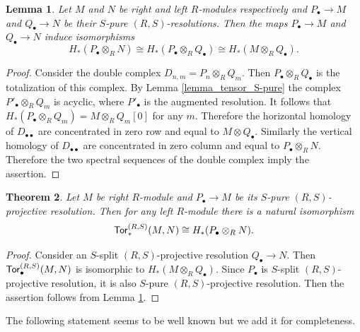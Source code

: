 \documentclass{amsart}
\numberwithin{equation}{section}
\newtheorem{theorem}{Theorem}[section]
\newtheorem{lemma}[theorem]{Lemma}
\theoremstyle{definition}
\begin{document}
\begin{lemma}\label{lemma_balance} Let $M$ and $N$ be right and left $R$-modules respectively and $P_\bullet\to M$ and $Q_\bullet \to N$ be their $S$-pure $(R,S)$-resolutions. Then the maps $P_\bullet\to M$ and $Q_\bullet\to N$ induce isomorphisms
$$H_*(P_\bullet\otimes_R N ) \cong H_*(P_\bullet \otimes_R Q_\bullet ) \cong H_*(M \otimes_R Q_\bullet).$$ 
\end{lemma}
\begin{proof}
Consider the double complex $D_{n,m}=P_n\otimes_RQ_m.$ Then $P_\bullet \otimes_R  Q_\bullet$ is the totalization of this complex. By Lemma \ref{lemma_tensor_S-pure} the complex $P'_\bullet \otimes_R Q_m$ is acyclic, where $P'_\bullet$ is the augmented resolution. It follows that $H_*(P_\bullet \otimes_R Q_m)=M\otimes_R Q_m [0]$ for any $m.$  Therefore the horizontal homology of $D_{\bullet\bullet}$ are concentrated in zero row and equal to $M\otimes Q_\bullet.$ Similarly the vertical homology of $D_{\bullet \bullet}$ are concentrated in zero column and equal to $P_\bullet \otimes_R N.$ Therefore the two spectral sequences of the double complex imply the assertion. 
\end{proof}
 
 
\begin{theorem}\label{theorem_pure_rel_gen}
Let $M$ be right $R$-module and  $P_\bullet\to M$ be its $S$-pure $(R,S)$-projective resolution. Then for any left $R$-module there is a natural isomorphism
$${\sf Tor}^{(R,S)}_*(M,N)\cong H_*(P_\bullet\otimes_R N).$$ 
\end{theorem}
\begin{proof}
Consider an $S$-split  $(R,S)$-projective resolution  $Q_\bullet\to N.$ Then ${\sf Tor}^{(R,S)}_\bullet(M,N)$ is isomorphic to $ H_*(M\otimes_R Q_\bullet).$ Since $P_\bullet$ is $S$-split $(R,S)$-projective resolution, it is also $S$-pure $(R,S)$-projective resolution. Then 
the assertion follows from Lemma \ref{lemma_balance}.
\end{proof}

The following statement seems to be well known but we add it for completeness. 
\end{document}
